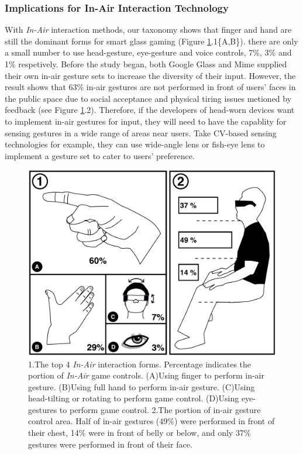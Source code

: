 \documentclass{sigchi}
\begin{document}
    \subsubsection{Implications for In-Air Interaction Technology}
    With \emph{In-Air} interaction methods, our taxonomy shows that finger and hand are still the dominant  forms for smart glass gaming (Figure \ref{fig:figureInAirPorpotion}.1\{A,B\}). there are only a small number to use head-gesture, eye-gesture and voice controls, 7\%, 3\% and 1\% respetively.
    Before the study began, both Google Glass and Mime\cite{GoogleGlass, Colaco:2013:MCL:2501988.2502042} supplied their own in-air gesture sets to increase the diversity of their input. However, the result shows that 63\% in-air gestures are not performed in front of users' faces in the public space due to social acceptance and physical tiring issues metioned by feedback (see Figure \ref{fig:figureInAirPorpotion}.2). Therefore, if the developers of head-worn devices want to implement in-air gestures for input, they will need to have the capablity for sensing gestures in a wide range of areas near users. Take CV-based sensing technologies for example, they can use wide-angle lens or fish-eye lens to implement a gesture set to cater to users' preference.   
  \begin{figure}[!h]
  \centering
  \includegraphics[width=1\columnwidth]{InAirControlArea.pdf}
  \caption{1.The top 4 \emph{In-Air} interaction forms. Percentage indicates the portion of \emph{In-Air} game controls. (A)Using finger to perform in-air gesture. (B)Using full hand to perform in-air gesture. (C)Using head-tilting or rotating to perform game control. (D)Using eye-gestures to perform game control. 2.The portion of in-air gesture control area. Half of in-air gestures (49\%) were performed in front of their chest, 14\% were in front of belly or below, and only 37\% gestures were performed in front of their face.}
  \label{fig:figureInAirPorpotion}
  \end{figure}
\end{document}
